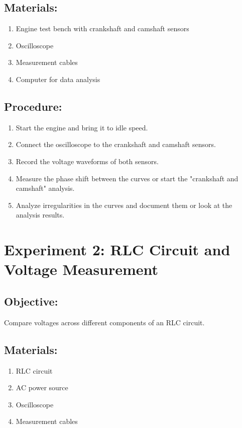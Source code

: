 \documentclass[]{scrreprt}
\begin{document}
    \subsection*{Materials:}
    \begin{enumerate}
        \item Engine test bench with crankshaft and camshaft sensors
        \item Oscilloscope
        \item Measurement cables
        \item Computer for data analysis
    \end{enumerate}
    \subsection*{Procedure:}
    \begin{enumerate}
        \item Start the engine and bring it to idle speed.
        \item Connect the oscilloscope to the crankshaft and camshaft sensors.
        \item Record the voltage waveforms of both sensors.
        \item Measure the phase shift between the curves or start the "crankshaft and camshaft" analysis.
        \item Analyze irregularities in the curves and document them or look at the analysis results.
    \end{enumerate}

    \section*{Experiment 2: RLC Circuit and Voltage Measurement}
    \subsection*{Objective:} Compare voltages across different components of an RLC circuit.
    \subsection*{Materials:}
    \begin{enumerate}
        \item RLC circuit
        \item AC power source
        \item Oscilloscope
        \item Measurement cables
    \end{enumerate}
\end{document}
